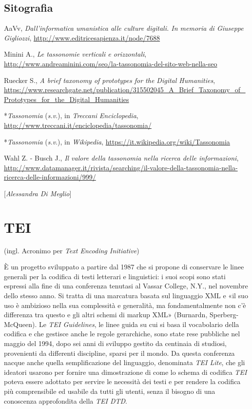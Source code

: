 {\section*{Sitografia}
{\parindent0pt 
AaVv, \emph{Dall'informatica umanistica alle culture digitali. In
memoria di Giuseppe Gigliozzi},
\url{http://www.editricesapienza.it/node/7688}

Minini A., \emph{Le tassonomie verticali e orizzontali},
\url{http://www.andreaminini.com/seo/la-tassonomia-del-sito-web-nella-seo}

Ruecker S., \emph{A brief taxonomy of prototypes for the Digital
Humanities},
\url{https://www.researchgate.net/publication/315502045_A_Brief_Taxonomy_of_Prototypes_for_the_Digital_Humanities}

*\emph{Tassonomia} (\emph{s.v}.), in \emph{Treccani}
\emph{Enciclopedia},
\url{http://www.treccani.it/enciclopedia/tassonomia/}

*\emph{Tassonomia} (\emph{s.v}.), in \emph{Wikipedia},
\url{https://it.wikipedia.org/wiki/Tassonomia}

Wahl Z. - Busch J., \emph{Il valore della tassonomia nella ricerca delle
informazioni},
\url{http://www.datamanager.it/rivista/searching/il-valore-della-tassonomia-nella-ricerca-delle-informazioni/999/}
}

\hrulefill 
 
{[}\emph{Alessandra Di Meglio}{]}




\chapter{TEI}

(ingl. Acronimo per \emph{Text Encoding Initiative})

È un progetto sviluppato a partire dal 1987 che si propone di conservare
le linee generali per la codifica di testi letterari e linguistici: i
suoi scopi sono stati espressi alla fine di una conferenza tenutasi al
Vassar College, N.Y., nel novembre dello stesso anno. Si tratta di una
marcatura basata sul linguaggio XML e «il suo uso è ambizioso nella sua
complessità e generalità, ma fondamentalmente non c'è differenza tra
questo e gli altri schemi di markup XML» (Burnardn, Sperberg-McQueen).
Le \emph{TEI Guidelines}, le linee guida su cui si basa il vocabolario
della codifica e che gestisce anche le regole gerarchiche, sono state
rese pubbliche nel maggio del 1994, dopo sei anni di sviluppo gestito da
centinaia di studiosi, provenienti da differenti discipline, sparsi per
il mondo. Da questa conferenza nacque anche quella semplificazione del
linguaggio, denominata \emph{TEI Lite}, che gli ideatori usarono per
fornire una dimostrazione di come lo schema di codifica \emph{TEI}
poteva essere adottato per servire le necessità dei testi e per rendere
la codifica più comprensibile ed usabile da tutti gli utenti, senza il
bisogno di una conoscenza approfondita della \emph{TEI DTD}.

}
